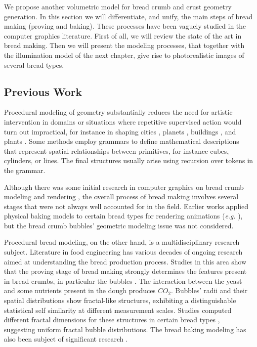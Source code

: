We propose another volumetric model for bread crumb and crust geometry generation.
In this section we will differentiate, and unify, the main steps of bread making (proving and baking).
These processes have been vaguely studied in the computer graphics literature.
First of all, we will review the state of the art in bread making.
Then we will present the modeling processes, that together with the illumination model of the next chapter, give rise to photorealistic images of several bread types.

\subsection{Previous Work}
Procedural modeling of geometry substantially reduces the need for artistic intervention in domains or situations where repetitive supervised action would turn out impractical, for instance in shaping cities \cite{Parish2001}, planets \cite{Ebert2002}, buildings \cite{Muller2006}, and plants \cite{Prusinkiewicz1990}. 
Some methods employ grammars to define mathematical descriptions that represent spatial relationships between primitives, for instance cubes, cylinders, or lines. 
The final structures usually arise using recursion over tokens in the grammar.

Although there was some initial research in computer graphics on bread crumb modeling and rendering \cite{Tong2005,Xenakis2007}, the overall process of bread making involves several stages that were not always well accounted for in the field.
Earlier works applied physical baking models to certain bread types for rendering animations ({\em e.g.} \cite{Rodriguez-Arenas2011}), but the bread crumb bubbles' geometric modeling issue was not considered.

Procedural bread modeling, on the other hand, is a multidisciplinary research subject.
Literature in food engineering has various decades of ongoing research aimed at understanding the bread production process. 
Studies in this area show that the proving stage of bread making strongly determines the features present in bread crumbs, in particular the bubbles \cite{Babin2006}.
The interaction between the yeast and some nutrients present in the dough produces {\em $CO_{2}$}. 
Bubbles' radii and their spatial distributions show fractal-like structures, exhibiting a distinguishable statistical self similarity at different measurement scales. 
Studies computed different fractal dimensions for these structures in certain bread types \cite{Gonzales2008}, suggesting uniform fractal bubble distributions. 
The bread baking modeling has also been subject of significant research \cite{Mondal2008}.

